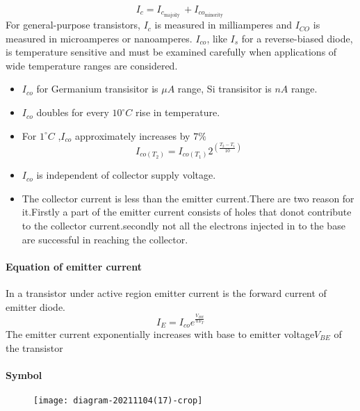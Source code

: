  $$I_{c}=I_{c_{\text {majoily }}}+I_{co_{\text {minority }}}$$
 For general-purpose transistors, $I_{c}$ is measured in milliamperes and $I_{C O}$ is measured in microamperes or nanoamperes. $I_{co}$, like $I_{s}$ for a reverse-biased diode, is temperature sensitive and must be examined carefully when applications of wide temperature ranges are considered.\\
 \begin{note}
 	\begin{itemize}
 		\item $I_{co}$ for Germanium transisitor is $\mu A$ range, Si transisitor is $nA$ range.\\
 		\item $I_{co}$ doubles for every $10^{\circ}C$ rise in temperature.\\
 		\item For $1^{\circ}C$ ,$I_{co}$  approximately increases by $7\%$
 		$$I_{co(T_2)}=I_{co(T_1)}2^{\left( \frac{T_2-T_1}{10}\right) }$$
 		\item $I_{co}$ is independent of collector supply voltage.\\
 		\item The collector current is less than the emitter current.There are two reason for it.Firstly a part of the emitter current consists of holes that donot contribute to the collector current.secondly not all the  electrons injected in to the base are successful in reaching the collector. 
 	\end{itemize}
 \end{note}
\paragraph{Equation of emitter current}
 In a transistor under active region emitter current is the forward current of emitter diode.\\
 $$I_{E}=I_{co}e^{\frac{V_{BE}}{nV_T}}$$
 The emitter current exponentially increases with base to emitter voltage$V_{BE}$ of the transistor
 \paragraph{Symbol}
 \begin{figure}[H]
 	\centering
 	\texttt{[image: diagram-20211104(17)-crop]}
 	\caption{}
 	\label{}
 \end{figure}
